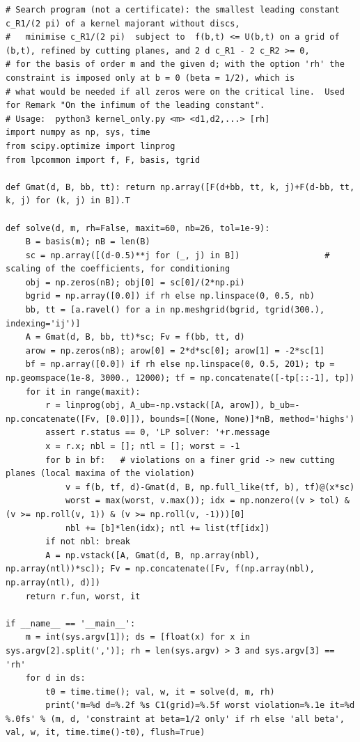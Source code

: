 \documentclass[11pt,reqno]{amsart}
\numberwithin{equation}{section}
\theoremstyle{definition}
\theoremstyle{remark}
\begin{document}
\begin{lstlisting}
# Search program (not a certificate): the smallest leading constant c_R1/(2 pi) of a kernel majorant without discs,
#   minimise c_R1/(2 pi)  subject to  f(b,t) <= U(b,t) on a grid of (b,t), refined by cutting planes, and 2 d c_R1 - 2 c_R2 >= 0,
# for the basis of order m and the given d; with the option 'rh' the constraint is imposed only at b = 0 (beta = 1/2), which is
# what would be needed if all zeros were on the critical line.  Used for Remark "On the infimum of the leading constant".
# Usage:  python3 kernel_only.py <m> <d1,d2,...> [rh]
import numpy as np, sys, time
from scipy.optimize import linprog
from lpcommon import f, F, basis, tgrid

def Gmat(d, B, bb, tt): return np.array([F(d+bb, tt, k, j)+F(d-bb, tt, k, j) for (k, j) in B]).T

def solve(d, m, rh=False, maxit=60, nb=26, tol=1e-9):
    B = basis(m); nB = len(B)
    sc = np.array([(d-0.5)**j for (_, j) in B])                 # scaling of the coefficients, for conditioning
    obj = np.zeros(nB); obj[0] = sc[0]/(2*np.pi)
    bgrid = np.array([0.0]) if rh else np.linspace(0, 0.5, nb)
    bb, tt = [a.ravel() for a in np.meshgrid(bgrid, tgrid(300.), indexing='ij')]
    A = Gmat(d, B, bb, tt)*sc; Fv = f(bb, tt, d)
    arow = np.zeros(nB); arow[0] = 2*d*sc[0]; arow[1] = -2*sc[1]
    bf = np.array([0.0]) if rh else np.linspace(0, 0.5, 201); tp = np.geomspace(1e-8, 3000., 12000); tf = np.concatenate([-tp[::-1], tp])
    for it in range(maxit):
        r = linprog(obj, A_ub=-np.vstack([A, arow]), b_ub=-np.concatenate([Fv, [0.0]]), bounds=[(None, None)]*nB, method='highs')
        assert r.status == 0, 'LP solver: '+r.message
        x = r.x; nbl = []; ntl = []; worst = -1
        for b in bf:   # violations on a finer grid -> new cutting planes (local maxima of the violation)
            v = f(b, tf, d)-Gmat(d, B, np.full_like(tf, b), tf)@(x*sc)
            worst = max(worst, v.max()); idx = np.nonzero((v > tol) & (v >= np.roll(v, 1)) & (v >= np.roll(v, -1)))[0]
            nbl += [b]*len(idx); ntl += list(tf[idx])
        if not nbl: break
        A = np.vstack([A, Gmat(d, B, np.array(nbl), np.array(ntl))*sc]); Fv = np.concatenate([Fv, f(np.array(nbl), np.array(ntl), d)])
    return r.fun, worst, it

if __name__ == '__main__':
    m = int(sys.argv[1]); ds = [float(x) for x in sys.argv[2].split(',')]; rh = len(sys.argv) > 3 and sys.argv[3] == 'rh'
    for d in ds:
        t0 = time.time(); val, w, it = solve(d, m, rh)
        print('m=%d d=%.2f %s C1(grid)=%.5f worst violation=%.1e it=%d  %.0fs' % (m, d, 'constraint at beta=1/2 only' if rh else 'all beta', val, w, it, time.time()-t0), flush=True)
\end{lstlisting}
\end{document}
